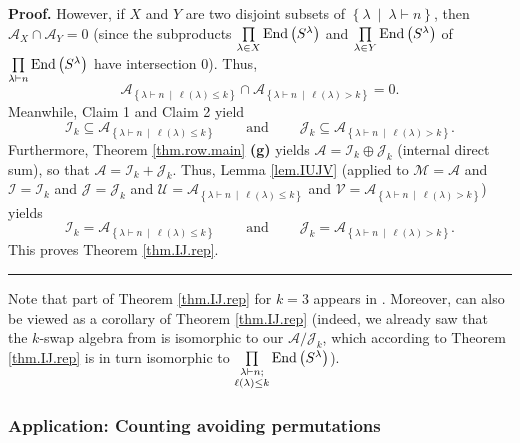 \documentclass[numbers=enddot,12pt,final,onecolumn,notitlepage]{scrartcl}%
\numberwithin{exer}{subsection}
\theoremstyle{definition}
\newenvironment{proof}[1][Proof]{\noindent\textbf{#1.} }{\ \rule{0.5em}{0.5em}}
\let\prodnonlimits\prod
\renewcommand{\prod}{\prodnonlimits\limits}
\begin{document}
\begin{proof}
However, if $X$ and $Y$ are two disjoint subsets of $\left\{  \lambda
\ \mid\ \lambda\vdash n\right\}  $, then $\mathcal{A}_{X}\cap\mathcal{A}%
_{Y}=0$ (since the subproducts $\prod\limits_{\lambda\in X}\operatorname*{End}%
\left(  S^{\lambda}\right)  $ and $\prod\limits_{\lambda\in Y}%
\operatorname*{End}\left(  S^{\lambda}\right)  $ of $\prod\limits_{\lambda
\vdash n}\operatorname*{End}\left(  S^{\lambda}\right)  $ have intersection
$0$). Thus,%
\[
\mathcal{A}_{\left\{  \lambda\vdash n\ \mid\ \ell\left(  \lambda\right)  \leq
k\right\}  }\cap\mathcal{A}_{\left\{  \lambda\vdash n\ \mid\ \ell\left(
\lambda\right)  >k\right\}  }=0.
\]
Meanwhile, Claim 1 and Claim 2 yield%
\[
\mathcal{I}_{k}\subseteq\mathcal{A}_{\left\{  \lambda\vdash n\ \mid
\ \ell\left(  \lambda\right)  \leq k\right\}  }\ \ \ \ \ \ \ \ \ \ \text{and}%
\ \ \ \ \ \ \ \ \ \ \mathcal{J}_{k}\subseteq\mathcal{A}_{\left\{
\lambda\vdash n\ \mid\ \ell\left(  \lambda\right)  >k\right\}  }.
\]
Furthermore, Theorem \ref{thm.row.main} \textbf{(g)} yields $\mathcal{A}%
=\mathcal{I}_{k}\oplus\mathcal{J}_{k}$ (internal direct sum), so that
$\mathcal{A}=\mathcal{I}_{k}+\mathcal{J}_{k}$. Thus, Lemma \ref{lem.IUJV}
(applied to $\mathcal{M}=\mathcal{A}$ and $\mathcal{I}=\mathcal{I}_{k}$ and
$\mathcal{J}=\mathcal{J}_{k}$ and $\mathcal{U}=\mathcal{A}_{\left\{
\lambda\vdash n\ \mid\ \ell\left(  \lambda\right)  \leq k\right\}  }$ and
$\mathcal{V}=\mathcal{A}_{\left\{  \lambda\vdash n\ \mid\ \ell\left(
\lambda\right)  >k\right\}  }$) yields
\[
\mathcal{I}_{k}=\mathcal{A}_{\left\{  \lambda\vdash n\ \mid\ \ell\left(
\lambda\right)  \leq k\right\}  }\ \ \ \ \ \ \ \ \ \ \text{and}%
\ \ \ \ \ \ \ \ \ \ \mathcal{J}_{k}=\mathcal{A}_{\left\{  \lambda\vdash
n\ \mid\ \ell\left(  \lambda\right)  >k\right\}  }.
\]
This proves Theorem \ref{thm.IJ.rep}.
\end{proof}

Note that part of Theorem \ref{thm.IJ.rep} for $k=3$ appears in
\cite[Proposition 3.5 (a)]{BCEHK23}. Moreover, \cite[Theorem 2.2]{KlStVo25}
can also be viewed as a corollary of Theorem \ref{thm.IJ.rep} (indeed, we
already saw that the $k$-swap algebra from \cite[Theorem 2.2]{KlStVo25} is
isomorphic to our $\mathcal{A}/\mathcal{J}_{k}$, which according to Theorem
\ref{thm.IJ.rep} is in turn isomorphic to $\prod\limits_{\substack{\lambda
\vdash n;\\\ell\left(  \lambda\right)  \leq k}}\operatorname*{End}\left(
S^{\lambda}\right)  $).

\subsubsection{Application: Counting avoiding permutations}
\end{document}

